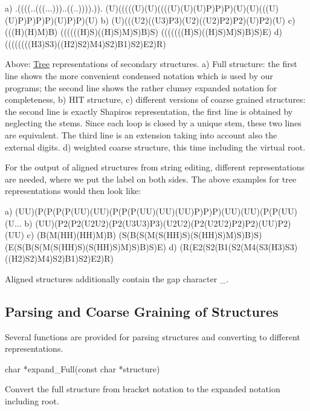 \begin{DoxyVerb}a) .((((..(((...)))..((..)))).)).
   (U)(((((U)(U)((((U)(U)(U)P)P)P)(U)(U)(((U)(U)P)P)P)P)(U)P)P)(U)
b) (U)(((U2)((U3)P3)(U2)((U2)P2)P2)(U)P2)(U)
c) (((H)(H)M)B)
   ((((((H)S)((H)S)M)S)B)S)
   (((((((H)S)((H)S)M)S)B)S)E)
d) ((((((((H3)S3)((H2)S2)M4)S2)B1)S2)E2)R)
\end{DoxyVerb}


Above\+: \hyperlink{structTree}{Tree} representations of secondary structures. a) Full structure\+: the first line shows the more convenient condensed notation which is used by our programs; the second line shows the rather clumsy expanded notation for completeness, b) H\+IT structure, c) different versions of coarse grained structures\+: the second line is exactly Shapiro\textquotesingle{}s representation, the first line is obtained by neglecting the stems. Since each loop is closed by a unique stem, these two lines are equivalent. The third line is an extension taking into account also the external digits. d) weighted coarse structure, this time including the virtual root.

For the output of aligned structures from string editing, different representations are needed, where we put the label on both sides. The above examples for tree representations would then look like\+:

\begin{DoxyVerb}a) (UU)(P(P(P(P(UU)(UU)(P(P(P(UU)(UU)(UU)P)P)P)(UU)(UU)(P(P(UU)(U...
b) (UU)(P2(P2(U2U2)(P2(U3U3)P3)(U2U2)(P2(U2U2)P2)P2)(UU)P2)(UU)
c) (B(M(HH)(HH)M)B)
   (S(B(S(M(S(HH)S)(S(HH)S)M)S)B)S)
   (E(S(B(S(M(S(HH)S)(S(HH)S)M)S)B)S)E)
d) (R(E2(S2(B1(S2(M4(S3(H3)S3)((H2)S2)M4)S2)B1)S2)E2)R)
\end{DoxyVerb}


Aligned structures additionally contain the gap character \textquotesingle{}\+\_\+\textquotesingle{}.

\subsection*{Parsing and Coarse Graining of Structures}

Several functions are provided for parsing structures and converting to different representations.

\begin{DoxyVerb}char  *expand_Full(const char *structure)
\end{DoxyVerb}
 Convert the full structure from bracket notation to the expanded notation including root.

